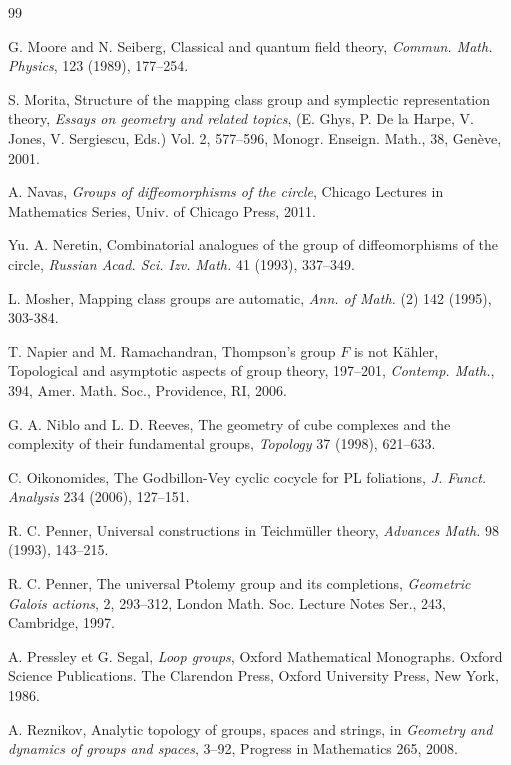 \documentclass[twoside]{irmaems}
\theoremstyle{plain}
\theoremstyle{definition}
\theoremstyle{remark}
\begin{document}
\begin{small}
\begin{thebibliography}{99}
         
G. Moore and N. Seiberg, { Classical and quantum field theory},  {\em  Commun. Math. Physics}, 123 (1989), 177--254. 


S. Morita, { Structure of the mapping class group and symplectic representation theory},  {\em  Essays on 
   geometry and related topics}, (E. Ghys, P. De la Harpe,  V. Jones, V. Sergiescu, Eds.) Vol. 2, 577--596, Monogr. Enseign. Math., 38, Gen\`eve, 2001.   
   


A. Navas, {\em Groups of diffeomorphisms of the circle}, {Chicago Lectures in
Mathematics Series}, Univ. of Chicago Press, 2011. 

Yu. A. Neretin, Combinatorial analogues of the group of
diffeomorphisms of the circle, {\it Russian Acad. Sci. Izv. Math.} { 41}
 (1993), 337--349.


L. Mosher, {  Mapping class groups are automatic}, 
{\em  Ann. of Math.} (2) 142 (1995), 303-384.

T. Napier and M.  Ramachandran, Thompson's group $F$ is not K\"ahler,  
Topological and asymptotic aspects of group theory,  197--201, 
{\em Contemp. Math.}, 394, Amer. Math. Soc., Providence, RI, 2006.

G. A. Niblo and L. D. Reeves, {
The geometry of cube complexes and the complexity of their fundamental groups}, 
{\em  Topology} 37 (1998), 621--633. 
   


C. Oikonomides, The Godbillon-Vey cyclic cocycle for PL
foliations, {\em J. Funct. Analysis} 234 (2006), 127--151.


R. C. Penner, { Universal constructions in Teichm\"uller theory}, 
{\em  Advances Math.}  98 (1993),  143--215.         
         
R. C. Penner, {The universal Ptolemy group and its completions},           
{\em  Geometric Galois actions}, 2, 293--312, London Math. Soc. 
Lecture Notes Ser., 243,         
Cambridge, 1997.   

A. Pressley et G. Segal, {\em Loop groups}, Oxford Mathematical Monographs.
Oxford Science Publications. The Clarendon Press, Oxford University Press, New
York, 1986.


A. Reznikov, Analytic topology of groups, spaces and strings, in
{\em Geometry and dynamics of groups and spaces}, 3--92, Progress in
Mathematics 265, 2008.



\end{thebibliography}
\end{small}
\end{document}
